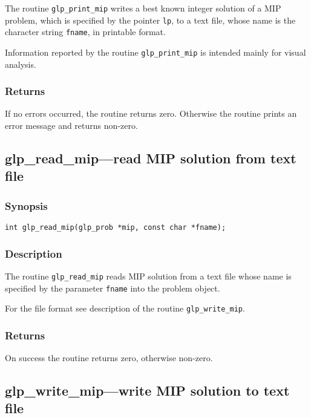 The routine \verb|glp_print_mip| writes a best known integer solution
of a MIP problem, which is specified by the pointer \verb|lp|, to a text
file, whose name is the character string \verb|fname|, in printable
format.

Information reported by the routine \verb|glp_print_mip| is intended
mainly for visual analysis.

\subsubsection*{Returns}

If no errors occurred, the routine returns zero. Otherwise the routine
prints an error message and returns non-zero.

\newpage

\subsection{glp\_read\_mip---read MIP solution from text file}

\subsubsection*{Synopsis}

\begin{verbatim}
int glp_read_mip(glp_prob *mip, const char *fname);
\end{verbatim}

\subsubsection*{Description}

The routine \verb|glp_read_mip| reads MIP solution from a text file
whose name is specified by the parameter \verb|fname| into the problem
object.

For the file format see description of the routine \verb|glp_write_mip|.

\subsubsection*{Returns}

On success the routine returns zero, otherwise non-zero.

\subsection{glp\_write\_mip---write MIP solution to text file}


